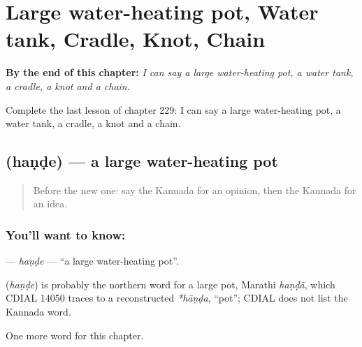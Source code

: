 
\chapter{Large water-heating pot, Water tank, Cradle, Knot, Chain}
\label{ch:ka-large-water-heating-pot-water-tank-cradle-knot-chain}

\begin{chapteropening}
\textbf{By the end of this chapter:} \emph{I can say a large water-heating pot, a water tank, a cradle, a knot and a chain.}

Complete the last lesson of chapter 229: I can say a large water-heating pot, a water tank, a cradle, a knot and a chain.
\end{chapteropening}

\section[\texorpdfstring{\kn{ಹಂಡೆ} (haṇḍe)}{ಹಂಡೆ (haṇḍe)}]{ (haṇḍe) — a large water-heating pot}

\label{lesson:KA-C229-hande}



\begin{quote}
Before the new one: say the Kannada for an opinion, then the Kannada for an idea.
\end{quote}

\subsection*{You'll want to know: }
\textbf{} — \emph{haṇḍe} — \textquotedblleft{}a large water-heating pot\textquotedblright{}.

\begin{cousinweb}
\textbf{} (\emph{haṇḍe}) is probably the northern word for a large pot, Marathi \emph{haṇḍā}, which CDIAL 14050 traces to a reconstructed \emph{*hāṇḍa}, \textquotedblleft{}pot\textquotedblright{}; CDIAL does not list the Kannada word.
\end{cousinweb}

\begin{grammarlens}[title={What you've built}]
One more word for this chapter.
\end{grammarlens}

